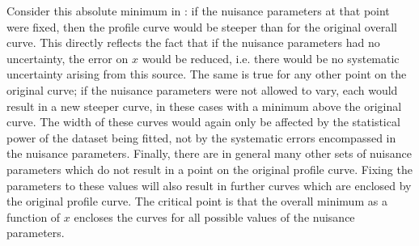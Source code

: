 Consider this absolute minimum in \nll: if the nuisance parameters at that
point were fixed, then the profile \nll curve would be steeper than for
the original overall \nll curve. This directly reflects the fact that
if the nuisance parameters had no uncertainty,
the error on $x$ would be reduced, i.e. there would be no systematic 
uncertainty arising from this source.
The same is true for any other point on the original curve; if the nuisance
parameters were not allowed to vary, each would result in a new steeper curve,
in these cases with a minimum above the original curve.
The width of these curves would again only be affected by the statistical
power of the dataset being fitted, not by the systematic errors encompassed
in the nuisance parameters.
Finally, there are in general
many other sets of nuisance parameters which do not result in a point on the
original profile curve. Fixing the parameters to these values will also result
in further curves which are enclosed by the original profile curve.
The critical point is that the overall minimum as a function
of $x$ encloses the curves for all possible values of the nuisance
parameters.

